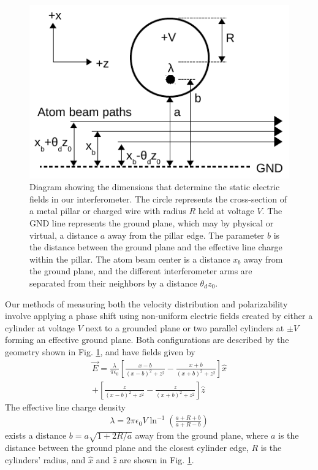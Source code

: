 \documentclass[twocolumn,prl,showpacs,superscriptaddress]{revtex4-1}   %
\newcommand{\figref}[1]{Fig. \ref{#1}}
\begin{document}
\begin{figure}
\includegraphics[width=\linewidth,keepaspectratio]{EDiagram1.pdf}
\caption{\label{EDiagram}Diagram showing the dimensions that determine the static electric fields in our interferometer. The circle represents the cross-section of a metal pillar or charged wire with radius $R$ held at voltage $V$. The GND line represents the ground plane, which may by physical or virtual, a distance $a$ away from the pillar edge. The parameter $b$ is the distance between the ground plane and the effective line charge within the pillar. The atom beam center is a distance $x_b$ away from the ground plane, and the different interferometer arms are separated from their neighbors by a distance $\theta_d z_0$.}
\end{figure}

Our methods of measuring both the velocity distribution and polarizability involve applying a phase shift using non-uniform electric fields created by either a cylinder at voltage $V$ next to a grounded plane or two parallel cylinders at $\pm V$ forming an effective ground plane. 
Both configurations are described by the geometry shown in \figref{EDiagram}, and have fields given by
\begin{align}
	\vec{E} = \frac{\lambda}{\pi\epsilon_0}
	\left[	
		\frac{x-b}{(x-b)^2+z^2} - \frac{x+b}{(x+b)^2+z^2}
	\right] \hat{x} \nonumber \\
	+ 
	\left[	
		\frac{z}{(x-b)^2+z^2} - \frac{z}{(x+b)^2+z^2}
	\right] \hat{z}
	\label{EPillars}
\end{align}
The effective line charge density
\begin{align}
	\lambda = 2\pi\epsilon_0V\ln^{-1}
	\left(
		\frac{a+R+b}{a+R-b}
	\right)
	\label{lambda}
\end{align}
exists a distance $b = a\sqrt{1+2R/a}$ away from the ground plane, where $a$ is the distance between the ground plane and the closest cylinder edge, $R$ is the cylinders' radius, and $\hat{x}$ and $\hat{z}$ are shown in \figref{EDiagram}.
\end{document}
